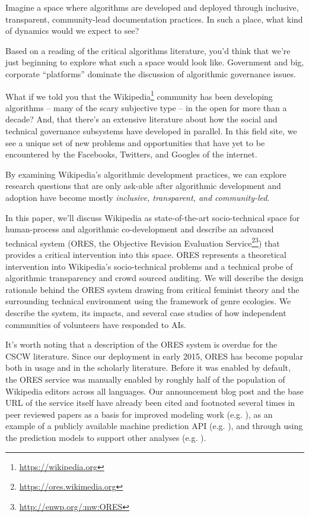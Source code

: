 Imagine a space where algorithms are developed and deployed through inclusive, transparent, community-lead documentation practices.  In such a place, what kind of dynamics would we expect to see?

Based on a reading of the critical algorithms literature, you'd think that we're just beginning to explore what such a space would look like.  Government and big, corporate ``platforms'' dominate the discussion of algorithmic governance issues\cite{crawford2016algorithm}\cite{diakopoulos2015algorithmic}\cite{gillespie2014relevance}\cite{tufekci2015algorithms}.

What if we told you that the Wikipedia\footnote{\url{https://wikipedia.org}} community has been developing algorithms -- many of the scary subjective type -- in the open for more than a decade?  And, that there's an extensive literature about how the social and technical governance subsystems have developed in parallel.  In this field site, we see a unique set of new problems and opportunities that have yet to be encountered by the Facebooks, Twitters, and Googles of the internet.

By examining Wikipedia's algorithmic development practices, we can explore research questions that are only ask-able after algorithmic development and adoption have become mostly \emph{inclusive, transparent, and community-led}.

In this paper, we'll discuss Wikipedia as state-of-the-art socio-technical space for human-process and algorithmic co-development and describe an advanced technical system (ORES, the Objective Revision Evaluation Service\footnote{\url{https://ores.wikimedia.org}}\footnote{\url{http://enwp.org/:mw:ORES}}) that provides a critical intervention into this space.  ORES represents a theoretical intervention into Wikipedia's socio-technical problems and a technical probe of algorithmic transparency and crowd sourced auditing.  We will describe the design rationale behind the ORES system drawing from critical feminist theory and the surrounding technical environment using the framework of genre ecologies.  We describe the system, its impacts, and several case studies of how independent communities of volunteers have responded to AIs.

It's worth noting that a description of the ORES system is overdue for the CSCW literature.  Since our deployment in early 2015, ORES has become popular both in usage and in the scholarly literature.  Before it was enabled by default, the ORES service was manually enabled by roughly half of the population of Wikipedia editors across all languages.  Our announcement blog post\cite{halfaker2015artificial} and the base URL of the service itself have already been cited and footnoted several times in peer reviewed papers as a basis for improved modeling work (e.g. \cite{dang2016quality}), as an example of a publicly available machine prediction API (e.g. \cite{lewoniewski2017relative}), and through using the prediction models to support other analyses (e.g. \cite{rezguia2017stigmergic}).


